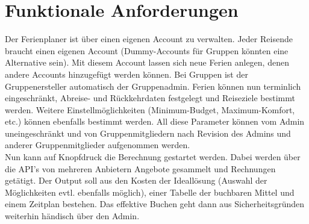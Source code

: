\documentclass[10pt,a4paper,titlepage,twoside,german,final]{zhawreprt}
\numberwithin{table}{chapter}
\begin{document}
\chapter{Funktionale Anforderungen}\label{chp:FunctionalRequirements}
Der Ferienplaner ist über einen eigenen Account zu verwalten. Jeder Reisende braucht einen eigenen Account (Dummy-Accounts für Gruppen könnten eine Alternative sein). Mit diesem Account lassen sich neue Ferien anlegen, denen andere Accounts hinzugefügt werden können. Bei Gruppen ist der Gruppenersteller automatisch der Gruppenadmin. Ferien können nun terminlich eingeschränkt, Abreise- und Rückkehrdaten festgelegt und Reiseziele bestimmt werden. Weitere Einstellmöglichkeiten (Minimum-Budget, Maximum-Komfort, etc.) können ebenfalls bestimmt werden. All diese Parameter können vom Admin uneingeschränkt und von Gruppenmitgliedern nach Revision des Admins und anderer Gruppenmitglieder aufgenommen werden.\\
Nun kann auf Knopfdruck die Berechnung gestartet werden. Dabei werden über die API's von mehreren Anbietern Angebote gesammelt und Rechnungen getätigt. Der Output soll aus den Kosten der Ideallösung (Auswahl der Möglichkeiten evtl. ebenfalls möglich), einer Tabelle der buchbaren Mittel und einem Zeitplan bestehen. Das effektive Buchen geht dann aus Sicherheitsgründen weiterhin händisch über den Admin.
\end{document}
